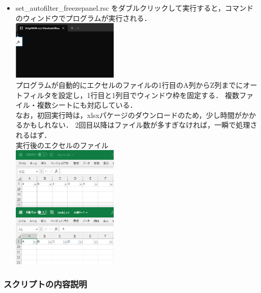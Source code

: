 \documentclass[
]{article}
\begin{document}
\begin{itemize}
\item
  set\_autofilter\_freezepanel.rsc をダブルクリックして実行すると，コマンドのウィンドウでプログラムが実行される．\\
  \includegraphics[width=0.4\textwidth,height=\textheight]{img/set_autofilter_freezepanel03.png}\\
  プログラムが自動的にエクセルのファイルの1行目のA列からZ列までにオートフィルタを設定し，1行目と1列目でウィンドウ枠を固定する．
  複数ファイル・複数シートにも対応している．\\
  なお，初回実行時は，xlsxパケージのダウンロードのため，少し時間がかかるかもしれない．
  2回目以降はファイル数が多すぎなければ，一瞬で処理されるはず．\\
  実行後のエクセルのファイル\\
  \includegraphics[width=0.4\textwidth,height=\textheight]{img/set_autofilter_freezepanel04.png}
\end{itemize}

\hypertarget{ux30b9ux30afux30eaux30d7ux30c8ux306eux5185ux5bb9ux8aacux660e}{%
\subsubsection{スクリプトの内容説明}\label{ux30b9ux30afux30eaux30d7ux30c8ux306eux5185ux5bb9ux8aacux660e}}
\end{document}
